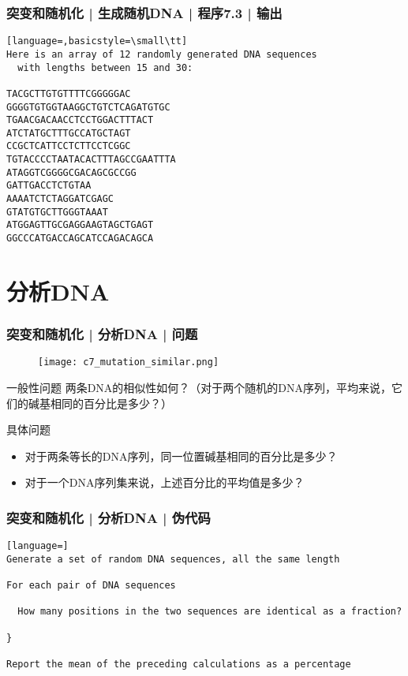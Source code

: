 \begin{frame}[fragile]
  \frametitle{突变和随机化 | 生成随机DNA | 程序7.3 | 输出}
  \vspace{-1.5em}
\begin{lstlisting}[language=,basicstyle=\small\tt]
Here is an array of 12 randomly generated DNA sequences
  with lengths between 15 and 30:

TACGCTTGTGTTTTCGGGGGAC
GGGGTGTGGTAAGGCTGTCTCAGATGTGC
TGAACGACAACCTCCTGGACTTTACT
ATCTATGCTTTGCCATGCTAGT
CCGCTCATTCCTCTTCCTCGGC
TGTACCCCTAATACACTTTAGCCGAATTTA
ATAGGTCGGGGCGACAGCGCCGG
GATTGACCTCTGTAA
AAAATCTCTAGGATCGAGC
GTATGTGCTTGGGTAAAT
ATGGAGTTGCGAGGAAGTAGCTGAGT
GGCCCATGACCAGCATCCAGACAGCA
\end{lstlisting}
\end{frame}

\section{分析DNA}
\begin{frame}
  \frametitle{突变和随机化 | 分析DNA | 问题}
  \begin{figure}
    \centering
    \texttt{[image: c7\_mutation\_similar.png]}
  \end{figure}
  \vspace{-1em}
  \begin{block}{一般性问题}
    两条DNA的相似性如何？（对于两个随机的DNA序列，平均来说，它们的碱基相同的百分比是多少？）
  \end{block}
  \pause
  \begin{block}{具体问题}
    \begin{itemize}
      \item 对于两条等长的DNA序列，同一位置碱基相同的百分比是多少？
      \item 对于一个DNA序列集来说，上述百分比的平均值是多少？
    \end{itemize}
  \end{block}
\end{frame}

\begin{frame}[fragile]
  \frametitle{突变和随机化 | 分析DNA | 伪代码}
  \vspace{-1.5em}
\begin{lstlisting}[language=]
Generate a set of random DNA sequences, all the same length

For each pair of DNA sequences

  How many positions in the two sequences are identical as a fraction?

}

Report the mean of the preceding calculations as a percentage
\end{lstlisting}
\end{frame}


